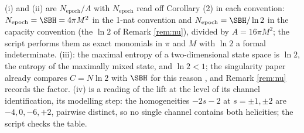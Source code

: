 (i) and (ii) are $N_{\mathrm{epoch}}/A$ with $N_{\mathrm{epoch}}$ read off Corollary (2) in each convention: $N_{\mathrm{epoch}} = \SBH = 4\pi M^2$ in the 1-nat convention and $N_{\mathrm{epoch}} = \SBH/\ln 2$ in the capacity convention (the $\ln 2$ of Remark \ref{rem:nu}), divided by $A = 16\pi M^2$; the script performs them as exact monomials in $\pi$ and $M$ with $\ln 2$ a formal indeterminate. (iii): the maximal entropy of a two-dimensional state space is $\ln 2$, the entropy of the maximally mixed state, and $\ln 2 < 1$; the singularity paper already compares $C = N\ln 2$ with $\SBH$ for this reason \cite[Prop.~10.7]{ButlerT5}, and Remark \ref{rem:nu} records the factor. (iv) is a reading of the lift at the level of its channel identification, its modelling step: the homogeneities $-2s - 2$ at $s = \pm 1, \pm 2$ are $-4, 0, -6, +2$, pairwise distinct, so no single channel contains both helicities; the script checks the table.
